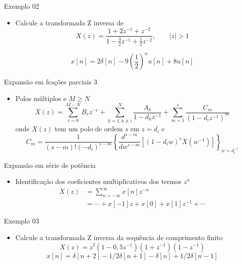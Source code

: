 \begin{slide}{Exemplo 02}
\begin{itemize}
   \item Calcule a transformada Z inversa de
      \begin{equation*}
          X(z) = \frac{1+2z^{-1}+z^{-2}}{1-\frac{3}{2}z^{-1}+\frac{1}{2}z^{-2}}, \qquad |z|>1
      \end{equation*}\pause
      
      \begin{equation*}
          x[n] = 2\delta [n]-9\left (\frac{1}{2} \right )^nu[n]+8u[n]
      \end{equation*}
\end{itemize}
\end{slide}

\begin{slide}{Expansão em frações parciais 3}
\begin{itemize}
   \item Polos múltiplos e $M\geq N$\footnotesize{
   \begin{equation*}
      X(z) = \sum_{r=0}^{M-N}B_rz^{-r}+\sum_{k=1, k\neq i}^N\frac{A_k}{1-d_kz^{-1}}+
      \sum_{m=1}^s\frac{C_m}{\left ( 1-d_iz^{-1} \right ) ^m}
   \end{equation*}}
   onde $X(z)$ tem um polo de ordem $s$ em $z = d_i$ e 
   \begin{equation*}
      C_m = \frac{1}{\left ( s - m\right )!\left ( -d_i\right )^{s-m}}\left \{ \frac{d^{s-m}}{dw^{s-m}} \left [ \left ( 1-d_iw \right )^s X\left ( w^{-1}\right )\right ]\right \}_{w = d_i^{-1}}
   \end{equation*}

\end{itemize}
\end{slide}


\begin{slide}{Expansão em série de potência}
\begin{itemize}
   \item Identificação dos coeficientes multiplicativos dos termos $z^n$
   \begin{align*}
      X(z) &= \sum_{n=-\infty}^{\infty}x[n]z^{-n}\\
           &= \cdots + x[-1]z+x[0]+x[1]z^{-1}+ \cdots
   \end{align*}
\end{itemize}
\end{slide}


\begin{slide}{Exemplo 03}
\begin{itemize}
   \item Calcule a transformada Z inversa da sequência de comprimento finito
      \begin{equation*}
         X(z) = z^2(1-0,5z^{-1})(1+z^{-1})(1-z^{-1})
      \end{equation*}\pause
     \begin{equation*}
         x[n]= \delta [n+2] - 1/2\delta [n+1] - \delta [n] +1/2 \delta [n-1]
      \end{equation*}
\end{itemize}
\end{slide}

